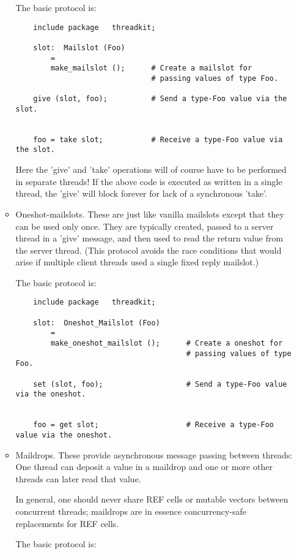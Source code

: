 \begin{itemize}
\begin{itemize}
The basic protocol is: 

\begin{verbatim}
    include package   threadkit;

    slot:  Mailslot (Foo)
        =
        make_mailslot ();      # Create a mailslot for
                               # passing values of type Foo.

    give (slot, foo);          # Send a type-Foo value via the slot.


    foo = take slot;           # Receive a type-Foo value via the slot.
\end{verbatim}


Here the 'give' and 'take' operations will of course 
have to be performed in separate threads!  If the above 
code is executed as written in a single thread, the 'give' 
will block forever for lack of a synchronous 'take'. 


\item 
Oneshot-mailslots.  These are just like vanilla mailslots 
except that they can be used only once.  They are typically 
created, passed to a server thread in a 'give' message, and 
then used to read the return value from the server thread. 
(This protocol avoids the race conditions that would arise 
if multiple client threads used a single fixed reply mailslot.) 

The basic protocol is: 

\begin{verbatim}
    include package   threadkit;

    slot:  Oneshot_Mailslot (Foo)
        =
        make_oneshot_mailslot ();      # Create a oneshot for
                                       # passing values of type Foo.

    set (slot, foo);                   # Send a type-Foo value via the oneshot.


    foo = get slot;                    # Receive a type-Foo value via the oneshot.
\end{verbatim}

\item 
Maildrops.  These provide asynchronous message passing 
between threads:  One thread can deposit a value in a 
maildrop and one or more other threads can later read 
that value.

In general, one should never share REF cells or mutable 
vectors between concurrent threads;  maildrops are in 
essence concurrency-safe replacements for REF cells. 

The basic protocol is: 


\end{itemize}
\end{itemize}
